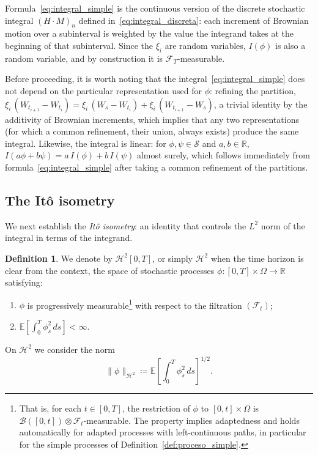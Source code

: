 \documentclass[11pt,a4paper,oneside]{report}
\theoremstyle{plain}
\theoremstyle{definition}
\newtheorem{definicion}[teorema]{Definition}
\theoremstyle{remark}
\newcommand{\R}{\mathbb{R}}
\newcommand{\E}{\mathbb{E}}
\newcommand{\F}{\mathcal{F}}
\newcommand{\1}{\mathbf{1}}
\newcommand{\eqdef}{\coloneqq}
\begin{document}
Formula~\eqref{eq:integral_simple} is the continuous version of the
discrete stochastic integral $(H \cdot M)_n$ defined
in~\eqref{eq:integral_discreta}: each increment of Brownian motion
over a subinterval is weighted by the value the integrand takes at
the beginning of that subinterval. Since the $\xi_i$ are random
variables, $I(\phi)$ is also a random variable, and by construction
it is $\F_T$-measurable.

Before proceeding,
it is worth noting that the integral~\eqref{eq:integral_simple} does
not depend on the particular representation used for $\phi$: refining
the partition,
$\xi_i\, (W_{t_{i+1}} - W_{t_i}) = \xi_i\, (W_s - W_{t_i}) + \xi_i\, (W_{t_{i+1}} - W_s)$,
a trivial identity by the additivity of Brownian increments, which
implies that any two representations (for which a common refinement,
their union, always exists) produce the same integral. Likewise, the
integral is linear: for $\phi, \psi \in \mathcal{S}$ and
$a, b \in \R$, $I(a\phi + b\psi) = a\, I(\phi) + b\, I(\psi)$ almost
surely, which follows immediately from
formula~\eqref{eq:integral_simple} after taking a common refinement
of the partitions.

\subsection{The Itô isometry}
\label{subsec:isometria_ito}

We next establish the \emph{Itô isometry}: an identity that controls
the $L^2$ norm of the integral in terms of the integrand.

\medskip

\begin{definicion}
\label{def:H2}
We denote by $\mathcal{H}^2[0, T]$, or simply $\mathcal{H}^2$ when
the time horizon is clear from the context, the space of stochastic
processes $\phi : [0, T] \times \Omega \to \R$ satisfying:
\begin{enumerate}[label=\textnormal{(\roman*)}]
   \item $\phi$ is progressively measurable\footnote{That is, for each
      $t \in [0, T]$, the restriction of $\phi$ to
      $[0, t] \times \Omega$ is $\mathcal{B}([0, t]) \otimes \F_t$-measurable.
      The property implies adaptedness and holds automatically for
      adapted processes with left-continuous paths, in particular for
      the simple processes of Definition~\ref{def:proceso_simple}.}
      with respect to the filtration $(\F_t)$;
  \item $\displaystyle \E\!\left[\int_0^T \phi_s^2\, ds\right] < \infty.$
\end{enumerate}
On $\mathcal{H}^2$ we consider the norm
\begin{equation}\label{eq:norma_H2}
  \|\phi\|_{\mathcal{H}^2}
  \eqdef \E\!\left[\int_0^T \phi_s^2\, ds\right]^{\!1/2}.
\end{equation}
\end{definicion}
\end{document}
